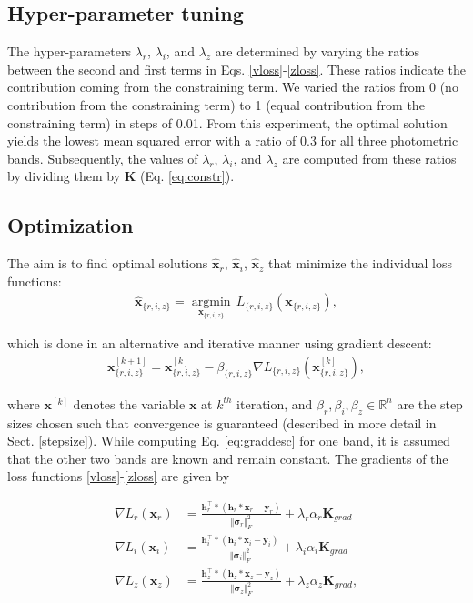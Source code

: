 \documentclass[traditabstract]{aa}
\begin{document}
\subsection{Hyper-parameter tuning}
\label{hyperparam}
The hyper-parameters $\lambda_{r}$, $\lambda_{i}$, and $\lambda_{z}$ are determined by varying the ratios between the second and first terms in Eqs. \ref{vloss}-\ref{zloss}. These ratios indicate the contribution coming from the constraining term. We varied the ratios from 0 (no contribution from the constraining term) to 1 (equal contribution from the constraining term) in steps of 0.01. From this experiment, the optimal solution yields the lowest mean squared error with a ratio of 0.3 for all three photometric bands. Subsequently, the values of $\lambda_{r}$, $\lambda_{i}$, and $\lambda_{z}$ are computed from these ratios by dividing them by $\textbf{K}$ (Eq. \ref{eq:constr}).


\subsection{Optimization}
\label{optimization}
The aim is to find optimal solutions $\mathbf{\hat{x}}_r$, $\mathbf{\hat{x}}_i$, $\mathbf{\hat{x}}_z$ that minimize the individual loss functions:
\begin{align*}
    \mathbf{\hat{x}}_{\{r,i,z\}} = \underset{\mathbf{x}_{\{r,i,z\}}}{\operatorname{argmin}} \hspace{2pt}L_{\{r,i,z\}}(\mathbf{x}_{\{r,i,z\}}),
\end{align*}

\noindent which is done in an alternative and iterative manner using gradient descent:
\begin{align}
    \mathbf{x}_{\{r,i,z\}}^{[k+1]} = \mathbf{x}_{\{r,i,z\}}^{[k]} - \beta_{\{r,i,z\}} \nabla L_{\{r,i,z\}}(\mathbf{x}_{\{r,i,z\}}^{[k]}), \label{eq:graddesc}
\end{align}


\noindent where $\mathbf{x}^{[k]}$ denotes the variable $\mathbf{x}$ at $k^{th}$ iteration, and $\beta_r, \beta_i, \beta_z \in \mathbb{R}^{n}$ are the step sizes chosen such that convergence is guaranteed (described in more detail in Sect. \ref{stepsize}). While computing Eq. \ref{eq:graddesc} for one band, it is assumed that the other two bands are known and remain constant. The gradients of the loss functions \ref{vloss}-\ref{zloss} are given by

\begin{align}
        \nabla L_r(\mathbf{x}_r) &= \frac{\mathbf{h}_r^\top \ast (\mathbf{h}_r \ast \mathbf{x}_r - \mathbf{y}_r)}{\left\Vert \mathbf{\sigma}_r \right\Vert_F^2} + \lambda_{r} \alpha_r \mathbf{K}_{grad} \\[5pt]
        \nabla L_i(\mathbf{x}_i) &= \frac{\mathbf{h}_i^\top \ast (\mathbf{h}_i \ast \mathbf{x}_i - \mathbf{y}_i)}{\left\Vert \mathbf{\sigma}_i \right\Vert_F^2} + \lambda_{i} \alpha_i \mathbf{K}_{grad} \\[5pt]
        \nabla L_z(\mathbf{x}_z) &= \frac{\mathbf{h}_z^\top \ast (\mathbf{h}_z \ast \mathbf{x}_z - \mathbf{y}_z)}{\left\Vert \mathbf{\sigma}_z \right\Vert_F^2} + \lambda_{z} \alpha_z \mathbf{K}_{grad},
\end{align}
\end{document}
